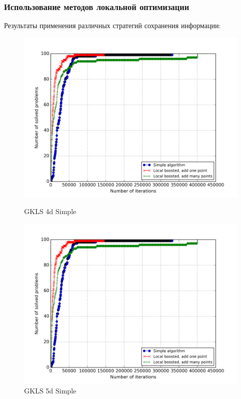 \documentclass[aspectratio=1610]{beamer}
\begin{document}
\begin{frame}
  \frametitle{Использование методов локальной оптимизации}
  Результаты применения различных стратегий сохранения информации:
  \begin{figure}[ht]
        \begin{minipage}[b]{0.49\linewidth}
            \centering
            \includegraphics[width=\textwidth]{local_search_op.png}
            \caption*{GKLS 4d Simple}
        \end{minipage}
        \begin{minipage}[b]{0.49\linewidth}
            \centering
            \includegraphics[width=\textwidth]{local_search_op.png}
            \caption*{GKLS 5d Simple}
        \end{minipage}
    \end{figure}
\end{frame}
\end{document}
